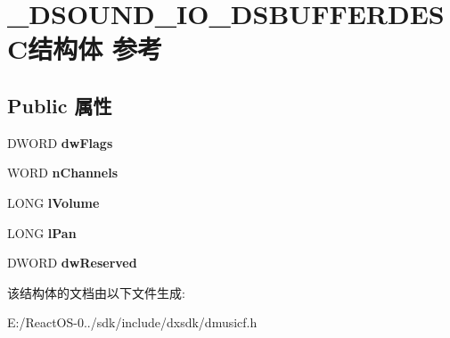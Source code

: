 \hypertarget{struct___d_s_o_u_n_d___i_o___d_s_b_u_f_f_e_r_d_e_s_c}{}\section{\+\_\+\+D\+S\+O\+U\+N\+D\+\_\+\+I\+O\+\_\+\+D\+S\+B\+U\+F\+F\+E\+R\+D\+E\+S\+C结构体 参考}
\label{struct___d_s_o_u_n_d___i_o___d_s_b_u_f_f_e_r_d_e_s_c}
\subsection*{Public 属性}
\begin{DoxyCompactItemize}
\item 
\mbox{\label{struct___d_s_o_u_n_d___i_o___d_s_b_u_f_f_e_r_d_e_s_c_a98ced4857803d09a64056d4375ae0f28}} 
D\+W\+O\+RD {\bfseries dw\+Flags}
\item 
\mbox{\label{struct___d_s_o_u_n_d___i_o___d_s_b_u_f_f_e_r_d_e_s_c_a35b9bf77186d7b07557db830dcaef99f}} 
W\+O\+RD {\bfseries n\+Channels}
\item 
\mbox{\label{struct___d_s_o_u_n_d___i_o___d_s_b_u_f_f_e_r_d_e_s_c_aab600a4155582aae3f103f49945939d0}} 
L\+O\+NG {\bfseries l\+Volume}
\item 
\mbox{\label{struct___d_s_o_u_n_d___i_o___d_s_b_u_f_f_e_r_d_e_s_c_a3e62fdb8cdac0384239c417241f83187}} 
L\+O\+NG {\bfseries l\+Pan}
\item 
\mbox{\label{struct___d_s_o_u_n_d___i_o___d_s_b_u_f_f_e_r_d_e_s_c_a116347f3a89947b562efdde17272ae11}} 
D\+W\+O\+RD {\bfseries dw\+Reserved}
\end{DoxyCompactItemize}


该结构体的文档由以下文件生成\+:\begin{DoxyCompactItemize}
\item 
E\+:/\+React\+O\+S-\/0../sdk/include/dxsdk/dmusicf.\+h\end{DoxyCompactItemize}
